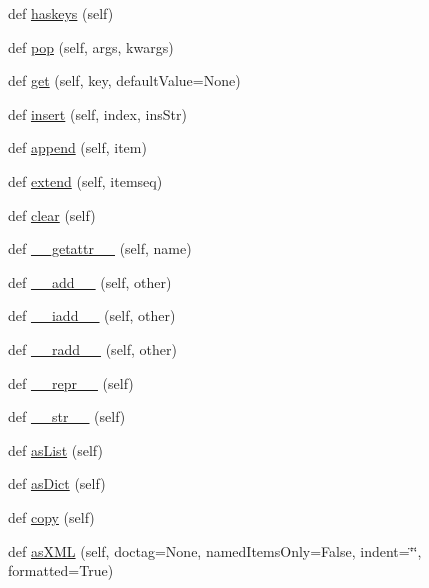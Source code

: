 \begin{DoxyCompactItemize}
\item 
def \hyperlink{classpyparsing_1_1ParseResults_a4ad55965fbf8d82c8cfba7929bdd7937}{haskeys} (self)
\item 
def \hyperlink{classpyparsing_1_1ParseResults_a30101c59176b4e2a9cf7c80245c4c011}{pop} (self, args, kwargs)
\item 
def \hyperlink{classpyparsing_1_1ParseResults_af9642671a6308855bc1fbd4263ce15e0}{get} (self, key, default\+Value=None)
\item 
def \hyperlink{classpyparsing_1_1ParseResults_a1395e40484eaaf9a3c29de216d414833}{insert} (self, index, ins\+Str)
\item 
def \hyperlink{classpyparsing_1_1ParseResults_a0cfa84dbce75b7250ee46fb10cd77b60}{append} (self, item)
\item 
def \hyperlink{classpyparsing_1_1ParseResults_a7cbd1685eda7882326fe0612e73064e6}{extend} (self, itemseq)
\item 
def \hyperlink{classpyparsing_1_1ParseResults_a2e60e3f784468a439b7eb784c8117900}{clear} (self)
\item 
def \hyperlink{classpyparsing_1_1ParseResults_a07708928d553eea522a9c48a3c95fa29}{\+\_\+\+\_\+getattr\+\_\+\+\_\+} (self, name)
\item 
def \hyperlink{classpyparsing_1_1ParseResults_a4a72f12b4bbbe0e5f2d235429469862e}{\+\_\+\+\_\+add\+\_\+\+\_\+} (self, other)
\item 
def \hyperlink{classpyparsing_1_1ParseResults_a3fe6b6ed2fead6fc49083e57f04b7c44}{\+\_\+\+\_\+iadd\+\_\+\+\_\+} (self, other)
\item 
def \hyperlink{classpyparsing_1_1ParseResults_ad1aca419525ff2767d845512187bc12a}{\+\_\+\+\_\+radd\+\_\+\+\_\+} (self, other)
\item 
def \hyperlink{classpyparsing_1_1ParseResults_a2f53c66e6ca92b7c9f3ef42fc3f0bc6d}{\+\_\+\+\_\+repr\+\_\+\+\_\+} (self)
\item 
def \hyperlink{classpyparsing_1_1ParseResults_af511ad40e9b6ad9b4544fa1dc136d59c}{\+\_\+\+\_\+str\+\_\+\+\_\+} (self)
\item 
def \hyperlink{classpyparsing_1_1ParseResults_a5c0bd2157d26ad4c82e2626f87d24962}{as\+List} (self)
\item 
def \hyperlink{classpyparsing_1_1ParseResults_a43d8bf5fe92801093dc5aaf6b4236937}{as\+Dict} (self)
\item 
def \hyperlink{classpyparsing_1_1ParseResults_ad97f867cf901b7f3c2ff8c4c6c9a33ac}{copy} (self)
\item 
def \hyperlink{classpyparsing_1_1ParseResults_aa12b73c0fa41b26c71a66de1532704d7}{as\+X\+ML} (self, doctag=None, named\+Items\+Only=False, indent=\char`\"{}\char`\"{}, formatted=True)

\end{DoxyCompactItemize}
